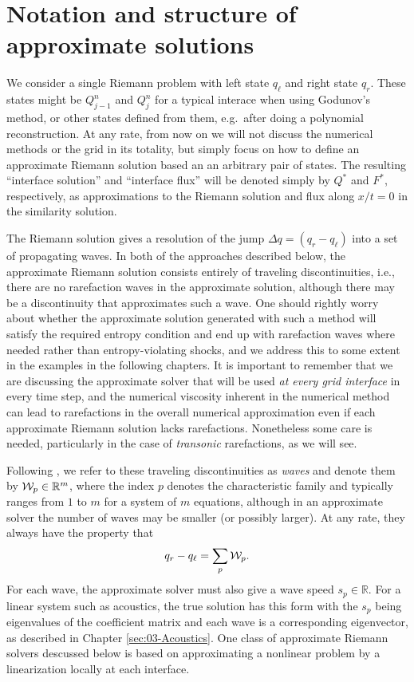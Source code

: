 \documentclass{SIAMbook2016}
\begin{document}
\hypertarget{notation-and-structure-of-approximate-solutions}{%
\section{Notation and structure of approximate
solutions}\label{notation-and-structure-of-approximate-solutions}}

We consider a single Riemann problem with left state \(q_\ell\) and
right state \(q_r\). These states might be \(Q_{j-1}^n\) and \(Q_j^n\)
for a typical interace when using Godunov's method, or other states
defined from them, e.g.~after doing a polynomial reconstruction. At any
rate, from now on we will not discuss the numerical methods or the grid
in its totality, but simply focus on how to define an approximate
Riemann solution based an an arbitrary pair of states. The resulting
``interface solution'' and ``interface flux'' will be denoted simply by
\(Q^*\) and \(F^*\), respectively, as approximations to the Riemann
solution and flux along \(x/t =0\) in the similarity solution.

The Riemann solution gives a resolution of the jump
\(\Delta q = (q_r - q_\ell)\) into a set of propagating waves. In both
of the approaches described below, the approximate Riemann solution
consists entirely of traveling discontinuities, i.e., there are no
rarefaction waves in the approximate solution, although there may be a
discontinuity that approximates such a wave. One should rightly worry
about whether the approximate solution generated with such a method will
satisfy the required entropy condition and end up with rarefaction waves
where needed rather than entropy-violating shocks, and we address this
to some extent in the examples in the following chapters. It is
important to remember that we are discussing the approximate solver that
will be used \emph{at every grid interface} in every time step, and the
numerical viscosity inherent in the numerical method can lead to
rarefactions in the overall numerical approximation even if each
approximate Riemann solution lacks rarefactions. Nonetheless some care
is needed, particularly in the case of \emph{transonic} rarefactions, as
we will see.

Following \cite{fvmhp}, we refer to these traveling discontinuities as
\emph{waves} and denote them by \({\cal W}_p \in {\mathbb R}^m\), where
the index \(p\) denotes the characteristic family and typically ranges
from \(1\) to \(m\) for a system of \(m\) equations, although in an
approximate solver the number of waves may be smaller (or possibly
larger). At any rate, they always have the property that
\begin{align}\label{Wsum}
q_r - q_\ell = \sum_{p} {\cal W}_p.
\end{align} For each wave, the approximate solver must also give a wave
speed \(s_p \in{\mathbb R}\). For a linear system such as acoustics, the
true solution has this form with the \(s_p\) being eigenvalues of the
coefficient matrix and each wave is a corresponding eigenvector, as
described in Chapter \ref{sec:03-Acoustics}. One class of approximate
Riemann solvers descussed below is based on approximating a nonlinear
problem by a linearization locally at each interface.
\end{document}
